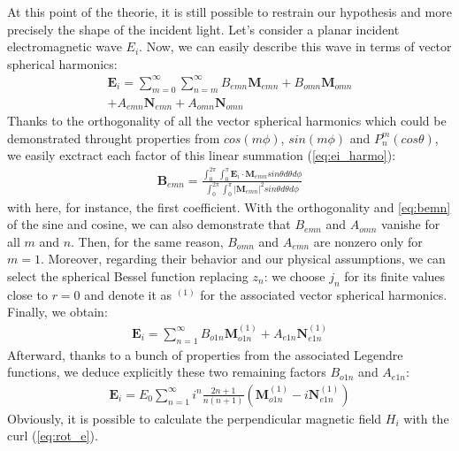 \documentclass{article}
\begin{document}
At this point of the theorie, it is still possible to restrain our hypothesis and more precisely the shape of the incident light. Let's consider a planar incident electromagnetic wave $E_{i}$. Now, we can easily describe this wave in terms of vector spherical harmonics:
\begin{equation}\label{eq:ei_harmo}
\begin{aligned}
    \textbf{E}_{i}=\sum_{m=0}^{\infty }\sum_{n=m}^{\infty }B_{emn}\textbf{M}_{emn}+B_{omn}\textbf{M}_{omn}\\
+A_{emn}\textbf{N}_{emn}+A_{omn}\textbf{N}_{omn}
\end{aligned}
\end{equation}
Thanks to the orthogonality of all the vector spherical harmonics which could be demonstrated throught properties from $cos(m\phi)$, $sin(m\phi)$ and $P_{n}^{m}(cos\theta)$, we easily exctract each factor of this linear summation (\ref{eq:ei_harmo}):
\begin{align}\label{eq:bemn}
\textbf{B}_{emn}=\frac{\int_{0}^{2\pi}\int_{0}^{\pi}\textbf{E}_{i}\cdot \textbf{M}_{emn}sin\theta d\theta d\phi}{\int_{0}^{2\pi}\int_{0}^{\pi}|\textbf{M}_{emn}|^{2}sin\theta d\theta d\phi}
\end{align}
with here, for instance, the first coefficient. With the orthogonality and \ref{eq:bemn} of the sine and cosine, we can also demonstrate that $B_{emn}$ and $A_{omn}$ vanishe for all $m$ and $n$. Then, for the same reason, $B_{omn}$ and $A_{emn}$ are nonzero only for $m=1$. Moreover, regarding their behavior and our physical assumptions, we can select the spherical Bessel function replacing $z_{n}$: we choose $j_{n}$ for its finite values close to $r=0$ and denote it as $^{(1)}$ for the associated vector spherical harmonics. Finally, we obtain:
\begin{align}
\textbf{E}_{i}=\sum_{n=1}^{\infty }B_{o1n}\textbf{M}^{(1)}_{o1n} + A_{e1n}\textbf{N}^{(1)}_{e1n}
\end{align}
Afterward, thanks to a bunch of properties from the associated Legendre functions, we deduce explicitly these two remaining factors $B_{o1n}$ and $A_{e1n}$:
\begin{align}
\textbf{E}_{i}=E_{0}\sum_{n=1}^{\infty }i^{n}\frac{2n+1}{n(n+1)}(\textbf{M}^{(1)}_{o1n} - i\textbf{N}^{(1)}_{e1n})
\end{align}
Obviously, it is possible to calculate the perpendicular magnetic field $H_{i}$ with the curl (\ref{eq:rot_e}).
\end{document}
